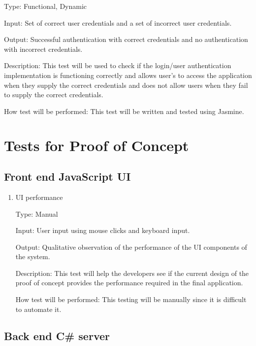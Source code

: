 \documentclass[12pt, titlepage]{article}
\begin{document}
\begin{enumerate}
\begin{enumerate}
Type: Functional, Dynamic

Input: Set of correct user credentials and a set of incorrect user credentials.

Output: Successful authentication with correct credentials and no
    authentication with incorrect credentials.
					
Description: This test will be used to check if the login/user authentication
    implementation is functioning correctly and allows user's to access the
    application when they supply the correct credentials and does not allow
    users when they fail to supply the correct credentials.
					

How test will be performed: This test will be written and tested using Jasmine.
				
\end{enumerate}

\section{Tests for Proof of Concept}

\subsection{Front end JavaScript UI}
		
\begin{enumerate}
					
\item{UI performance\\}

Type: Manual

Input: User input using mouse clicks and keyboard input.

Output: Qualitative observation of the performance of the UI components of the
system.
					
Description: This test will help the developers see if the current design of
the proof of concept provides the performance required in the final
application.
					
How test will be performed: This testing will be manually since it is difficult
to automate it.

\end{enumerate}

\subsection{Back end C\# server}

\begin{enumerate}


\end{enumerate}
\end{enumerate}
\end{document}
